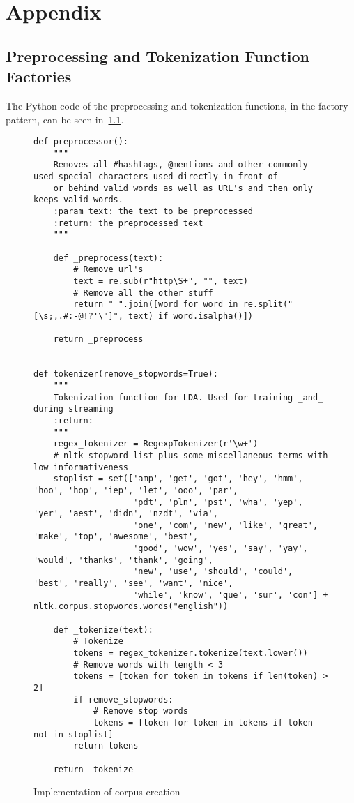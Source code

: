\chapter{Appendix}
\label{ch:appendix}

\section{Preprocessing and Tokenization Function Factories}
\label{sec:preprocessingAndTokenizationFunctionFactories}
The Python code of the preprocessing and tokenization functions,
in the factory pattern, can be seen in~\cref{code:preprocessing_tokenization}.

\begin{figure}
    \caption{Implementation of corpus-creation}
    \label{code:preprocessing_tokenization}
    \begin{verbatim}
def preprocessor():
    """
    Removes all #hashtags, @mentions and other commonly used special characters used directly in front of
    or behind valid words as well as URL's and then only keeps valid words.
    :param text: the text to be preprocessed
    :return: the preprocessed text
    """

    def _preprocess(text):
        # Remove url's
        text = re.sub(r"http\S+", "", text)
        # Remove all the other stuff
        return " ".join([word for word in re.split("[\s;,.#:-@!?'\"]", text) if word.isalpha()])

    return _preprocess


def tokenizer(remove_stopwords=True):
    """
    Tokenization function for LDA. Used for training _and_ during streaming
    :return:
    """
    regex_tokenizer = RegexpTokenizer(r'\w+')
    # nltk stopword list plus some miscellaneous terms with low informativeness
    stoplist = set(['amp', 'get', 'got', 'hey', 'hmm', 'hoo', 'hop', 'iep', 'let', 'ooo', 'par',
                    'pdt', 'pln', 'pst', 'wha', 'yep', 'yer', 'aest', 'didn', 'nzdt', 'via',
                    'one', 'com', 'new', 'like', 'great', 'make', 'top', 'awesome', 'best',
                    'good', 'wow', 'yes', 'say', 'yay', 'would', 'thanks', 'thank', 'going',
                    'new', 'use', 'should', 'could', 'best', 'really', 'see', 'want', 'nice',
                    'while', 'know', 'que', 'sur', 'con'] + nltk.corpus.stopwords.words("english"))

    def _tokenize(text):
        # Tokenize
        tokens = regex_tokenizer.tokenize(text.lower())
        # Remove words with length < 3
        tokens = [token for token in tokens if len(token) > 2]
        if remove_stopwords:
            # Remove stop words
            tokens = [token for token in tokens if token not in stoplist]
        return tokens

    return _tokenize
    \end{verbatim}
\end{figure}

\newpage
